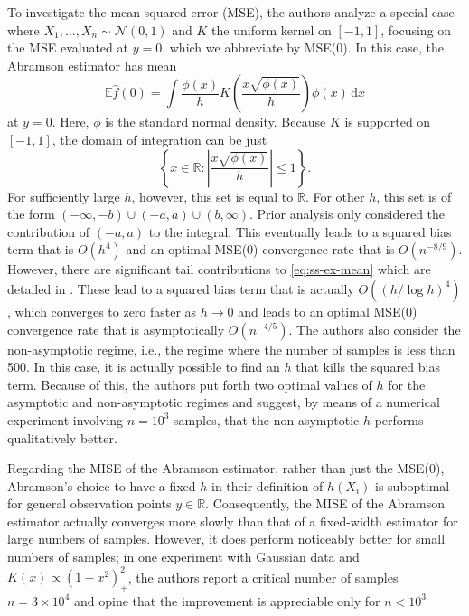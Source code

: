 \documentclass{article}
\newcommand{\E}{\mathbb{E}}
\newcommand{\R}{\mathbb{R}}
\newcommand{\abs}[1]{\left|#1\right|}
\newcommand{\dd}[1]{\,\text{d}#1}
\begin{document}
\sloppy To investigate the mean-squared error (MSE), the authors analyze a special case where $X_1, \dots, X_n \sim \mathcal{N}(0,1)$ and $K$ the uniform kernel on $[-1,1]$, focusing on the MSE evaluated at $y=0$, which we abbreviate by MSE(0). In this case, the Abramson estimator has mean 
\begin{equation}\label{eq:ss-ex-mean}
    \E \hat{f}(0) = \int \frac{\phi(x)}{h} K\left(\frac{x\sqrt{\phi(x)}}{h}\right) \phi(x)\dd{x}
\end{equation}
at $y=0$. Here, $\phi$ is the standard normal density. Because $K$ is supported on $[-1,1]$, the domain of integration can be just 
\begin{equation}\label{eq:ss-ex-dom}
    \left\{x \in \R : \abs{\frac{x\sqrt{\phi(x)}}{h}} \leq 1\right\}.
\end{equation}
For sufficiently large $h$, however, this set is equal to $\R$. For other $h$, this set is of the form $(-\infty,-b) \cup (-a,a) \cup(b,\infty)$. Prior analysis only considered the contribution of $(-a, a)$ to the integral. This eventually leads to a squared bias term that is $O\left(h^4\right)$ and an optimal MSE(0) convergence rate that is $O\left(n^{-8/9}\right)$. However, there are significant tail contributions to \eqref{eq:ss-ex-mean} which are detailed in \cite{vkde}. These lead to a squared bias term that is actually $O\left(\left(h / \log h\right)^4\right)$, which converges to zero faster as $h \to 0$ and leads to an optimal MSE(0) convergence rate that is asymptotically $O\left(n^{-4/5}\right)$. The authors also consider the non-asymptotic regime, i.e., the regime where the number of samples is less than 500. In this case, it is actually possible to find an $h$ that kills the squared bias term. Because of this, the authors put forth two optimal values of $h$ for the asymptotic and non-asymptotic regimes and suggest, by means of a numerical experiment involving $n=10^3$ samples, that the non-asymptotic $h$ performs qualitatively better.

Regarding the MISE of the Abramson estimator, rather than just the MSE(0), Abramson's choice to have a fixed $h$ in their definition of $h(X_i)$ is suboptimal for general observation points $y \in \R$. Consequently, the MISE of the Abramson estimator actually converges more slowly than that of a fixed-width estimator for large numbers of samples. However, it does perform noticeably better for small numbers of samples; in one experiment with Gaussian data and $K(x) \propto (1-x^2)_+^2$, the authors report a critical number of samples $n=3 \times 10^4$ and opine that the improvement is appreciable only for $n<10^3$
\end{document}
